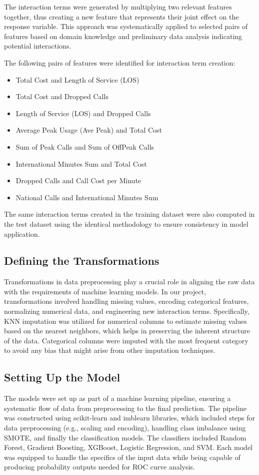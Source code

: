 \documentclass{article}
\begin{document}
The interaction terms were generated by multiplying two relevant features together, thus creating a new feature that represents their joint effect on the response variable. This approach was systematically applied to selected pairs of features based on domain knowledge and preliminary data analysis indicating potential interactions.

The following pairs of features were identified for interaction term creation:
\begin{itemize}
    \item Total Cost and Length of Service (LOS)


\item Total Cost and Dropped Calls
\item Length of Service (LOS) and Dropped Calls
\item Average Peak Usage (Ave Peak) and Total Cost
\item Sum of Peak Calls and Sum of OffPeak Calls
\item International Minutes Sum and Total Cost
\item Dropped Calls and Call Cost per Minute
\item National Calls and International Minutes Sum
\end{itemize}


The same interaction terms created in the training dataset were also computed in the test dataset using the identical methodology to ensure consistency in model application. 



\subsection{Defining the Transformations}
Transformations in data preprocessing play a crucial role in aligning the raw data with the requirements of machine learning models. In our project, transformations involved handling missing values, encoding categorical features, normalizing numerical data, and engineering new interaction terms. Specifically, KNN imputation was utilized for numerical columns to estimate missing values based on the nearest neighbors, which helps in preserving the inherent structure of the data. Categorical columns were imputed with the most frequent category to avoid any bias that might arise from other imputation techniques.

\subsection{Setting Up the Model}
The models were set up as part of a machine learning pipeline, ensuring a systematic flow of data from preprocessing to the final prediction. The pipeline was constructed using scikit-learn and imblearn libraries, which included steps for data preprocessing (e.g., scaling and encoding), handling class imbalance using SMOTE, and finally the classification models. The classifiers included Random Forest, Gradient Boosting, XGBoost, Logistic Regression, and SVM. Each model was equipped to handle the specifics of the input data while being capable of producing probability outputs needed for ROC curve analysis.
\end{document}
